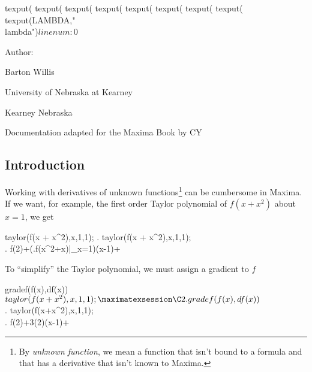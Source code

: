 

\beginmaximanoshow
texput(%
texput(%
texput(%
texput(%
texput(%
texput(%
texput(%
texput(%
texput(LAMBDA,"\\lambda")$
linenum : 0$
\maximaoutput




















\endmaximanoshow

\noindent Author: 

   Barton Willis 
   
   University of Nebraska at Kearney 
   
   Kearney Nebraska

\vspace{2ex}

\noindent Documentation adapted for the Maxima Book by CY

\subsection*{Introduction}

\noindent  Working with derivatives of unknown functions\footnote{By
{\em unknown  function\/}, we mean a function that isn't bound to a formula and
that has a derivative that isn't known to Maxima.} can be  cumbersome in Maxima.
If we want, for example, the first order  Taylor polynomial of 
$f(x + x^2)$ about $x = 1$, we get

\beginmaximasession
taylor(f(x + x^2),x,1,1);
\maximatexsession
{}.  taylor(f(x + x^2),x,1,1); \\
.  f\left(2\right)+\left(\left.\*f\left(x^{2}+x\right)\right|_{x=1}\right)\*\left(x-1\right)+\cdots \\
\endmaximasession

\noindent To ``simplify'' the Taylor polynomial, we must assign a gradient to $f$ 

\beginmaximasession
gradef(f(x),df(x))$
taylor(f(x+x^2),x,1,1);
\maximatexsession
\C2.  gradef(f(x),df(x))$ \\
.  taylor(f(x+x^2),x,1,1); \\
.  f\left(2\right)+3\*\left(2\right)\*\left(x-1\right)+\cdots \\
\endmaximasession

